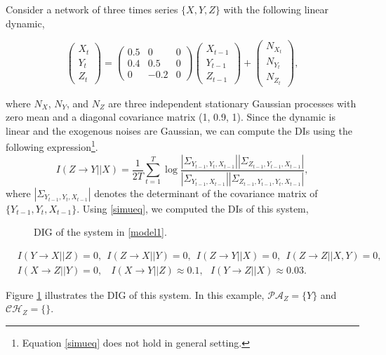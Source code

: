 \begin{example}\label{r1}
Consider a network of three times series $\{X,Y,Z\}$ with the following linear dynamic,
\begin{small}
\begin{equation}\label{model1}
\begin{pmatrix}
X_t \\
Y_t\\
Z_t
\end{pmatrix}=\begin{pmatrix}
0.5 & 0& 0\\
0.4 & 0.5 & 0\\
0 & -0.2 & 0
\end{pmatrix}\begin{pmatrix}
X_{t-1} \\
Y_{t-1}\\
Z_{t-1}
\end{pmatrix}+\begin{pmatrix}
N_{X_t} \\
N_{Y_t}\\
N_{Z_t}
\end{pmatrix},
\end{equation}
\end{small}
where $N_X$, $N_Y$, and $N_Z$ are three independent stationary Gaussian processes with zero mean and a diagonal covariance matrix (1, 0.9, 1). 
Since the dynamic is linear and the exogenous noises are Gaussian, we can compute the DIs using the following expression\footnote{Equation \eqref{simueq} does not hold in general setting.}\citet{acc2014}.
\begin{equation}\label{simueq}
I(Z\rightarrow Y||X)=\frac{1}{2T}\sum_{t=1}^{T}\log\frac{|\Sigma_{Y_{t-1},Y_{t},X_{t-1}}||\Sigma_{Z_{t-1},Y_{t-1},X_{t-1}}|}{|\Sigma_{Y_{t-1},X_{t-1}}||\Sigma_{Z_{t-1},Y_{t-1},Y_{t},X_{t-1}}|},
\end{equation}
where $|\Sigma_{Y_{t-1},Y_{t},X_{t-1}}|$ denotes the determinant of the covariance matrix of $\{Y_{t-1},Y_{t},X_{t-1}\}$. Using \eqref{simueq}, we computed the DIs of this system,
\begin{figure}
\hspace{4cm}
   \caption{DIG of the system in \eqref{model1}.}\label{fig:example_dig}
\end{figure}
\begin{small}
\begin{align*}
&I(Y\rightarrow X||Z)=0,\ \ I(Z\rightarrow X||Y)=0,\ \ I(Z\rightarrow Y||X)=0,\ \ I(Z\rightarrow Z||X,Y)=0,\\
&I(X\rightarrow Z||Y)=0,\ \ \ \ I(X\rightarrow Y||Z)\approx 0.1, \ \ \ I(Y\rightarrow Z||X)\approx 0.03.
\end{align*}
\end{small}
Figure \ref{fig:example_dig} illustrates the DIG of this system. In this example, $\mathcal{PA}_Z=\{Y\}$ and $\mathcal{CH}_Z=\{\}$.
\end{example}


